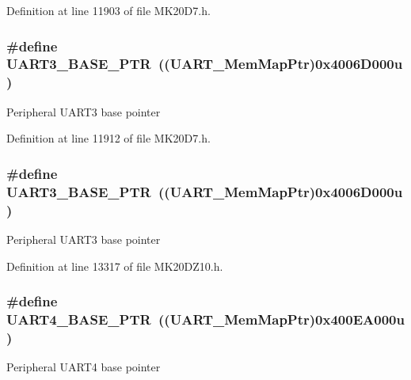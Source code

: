 Definition at line 11903 of file M\+K20\+D7.\+h.

\subsubsection[{\texorpdfstring{U\+A\+R\+T3\+\_\+\+B\+A\+S\+E\+\_\+\+P\+TR}{UART3_BASE_PTR}}]{\setlength{\rightskip}{0pt plus 5cm}\#define U\+A\+R\+T3\+\_\+\+B\+A\+S\+E\+\_\+\+P\+TR~(({\bf U\+A\+R\+T\+\_\+\+Mem\+Map\+Ptr})0x4006\+D000u)}\hypertarget{group___u_a_r_t___peripheral_gadf42d0466618b9209401839e1af9b3c4}{}\label{group___u_a_r_t___peripheral_gadf42d0466618b9209401839e1af9b3c4}
Peripheral U\+A\+R\+T3 base pointer 

Definition at line 11912 of file M\+K20\+D7.\+h.

\subsubsection[{\texorpdfstring{U\+A\+R\+T3\+\_\+\+B\+A\+S\+E\+\_\+\+P\+TR}{UART3_BASE_PTR}}]{\setlength{\rightskip}{0pt plus 5cm}\#define U\+A\+R\+T3\+\_\+\+B\+A\+S\+E\+\_\+\+P\+TR~(({\bf U\+A\+R\+T\+\_\+\+Mem\+Map\+Ptr})0x4006\+D000u)}\hypertarget{group___u_a_r_t___peripheral_gadf42d0466618b9209401839e1af9b3c4}{}\label{group___u_a_r_t___peripheral_gadf42d0466618b9209401839e1af9b3c4}
Peripheral U\+A\+R\+T3 base pointer 

Definition at line 13317 of file M\+K20\+D\+Z10.\+h.

\subsubsection[{\texorpdfstring{U\+A\+R\+T4\+\_\+\+B\+A\+S\+E\+\_\+\+P\+TR}{UART4_BASE_PTR}}]{\setlength{\rightskip}{0pt plus 5cm}\#define U\+A\+R\+T4\+\_\+\+B\+A\+S\+E\+\_\+\+P\+TR~(({\bf U\+A\+R\+T\+\_\+\+Mem\+Map\+Ptr})0x400\+E\+A000u)}\hypertarget{group___u_a_r_t___peripheral_ga680f97e081544c697ee071702b2de587}{}\label{group___u_a_r_t___peripheral_ga680f97e081544c697ee071702b2de587}
Peripheral U\+A\+R\+T4 base pointer 

